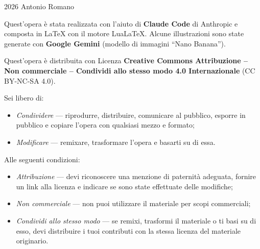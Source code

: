 %
%
%



% 


\maketitle

\thispagestyle{empty}
\vspace*{\fill}
\begingroup
\setlength{\parindent}{0pt}
\small

\textcopyright{} 2026 Antonio Romano
\medskip

Quest'opera \`e stata realizzata con l'aiuto di \textbf{Claude Code} di Anthropic
e composta in \LaTeX{} con il motore Lua\LaTeX. Alcune illustrazioni sono state
generate con \textbf{Google Gemini} (modello di immagini ``Nano Banana'').
\medskip

Quest'opera \`e distribuita con Licenza \textbf{Creative Commons Attribuzione --
Non commerciale -- Condividi allo stesso modo 4.0 Internazionale}
(CC BY-NC-SA 4.0).
\smallskip

Sei libero di:
\begin{itemize}\setlength{\itemsep}{0pt}
  \item \emph{Condividere} --- riprodurre, distribuire, comunicare al pubblico,
        esporre in pubblico e copiare l'opera con qualsiasi mezzo e formato;
  \item \emph{Modificare} --- remixare, trasformare l'opera e basarti su di essa.
\end{itemize}
Alle seguenti condizioni:
\begin{itemize}\setlength{\itemsep}{0pt}
  \item \emph{Attribuzione} --- devi riconoscere una menzione di paternit\`a
        adeguata, fornire un link alla licenza e indicare se sono state
        effettuate delle modifiche;
  \item \emph{Non commerciale} --- non puoi utilizzare il materiale per scopi
        commerciali;
  \item \emph{Condividi allo stesso modo} --- se remixi, trasformi il materiale o
        ti basi su di esso, devi distribuire i tuoi contributi con la stessa
        licenza del materiale originario.
\end{itemize}

